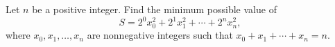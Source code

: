 Let $n$ be a positive integer. Find the minimum possible value of
\[ S = 2^0 x_0^2 + 2^1 x_1^2 + \cdots + 2^n x_n^2, \]
where $x_0, x_1, \ldots, x_n$ are nonnegative integers such that $x_0 + x_1 + \cdots + x_n = n$.

